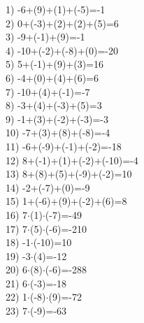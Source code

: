 \documentclass[a4paper,10pt]{article}
\begin{document}
1)   -6+(9)+(1)+(-5)=-1
\vspace{0.5cm}\\2)   0+(-3)+(2)+(2)+(5)=6
\vspace{0.5cm}\\3)   -9+(-1)+(9)=-1
\vspace{0.5cm}\\4)   -10+(-2)+(-8)+(0)=-20
\vspace{0.5cm}\\5)   5+(-1)+(9)+(3)=16
\vspace{0.5cm}\\6)   -4+(0)+(4)+(6)=6
\vspace{0.5cm}\\7)   -10+(4)+(-1)=-7
\vspace{0.5cm}\\8)   -3+(4)+(-3)+(5)=3
\vspace{0.5cm}\\9)   -1+(3)+(-2)+(-3)=-3
\vspace{0.5cm}\\10)   -7+(3)+(8)+(-8)=-4
\vspace{0.5cm}\\11)   -6+(-9)+(-1)+(-2)=-18
\vspace{0.5cm}\\12)   8+(-1)+(1)+(-2)+(-10)=-4
\vspace{0.5cm}\\13)   8+(8)+(5)+(-9)+(-2)=10
\vspace{0.5cm}\\14)   -2+(-7)+(0)=-9
\vspace{0.5cm}\\15)   1+(-6)+(9)+(-2)+(6)=8
\vspace{0.5cm}\\16)   7$\cdot$(1)$\cdot$(-7)=-49
\vspace{0.5cm}\\17)   7$\cdot$(5)$\cdot$(-6)=-210
\vspace{0.5cm}\\18)   -1$\cdot$(-10)=10
\vspace{0.5cm}\\19)   -3$\cdot$(4)=-12
\vspace{0.5cm}\\20)   6$\cdot$(8)$\cdot$(-6)=-288
\vspace{0.5cm}\\21)   6$\cdot$(-3)=-18
\vspace{0.5cm}\\22)   1$\cdot$(-8)$\cdot$(9)=-72
\vspace{0.5cm}\\23)   7$\cdot$(-9)=-63
\end{document}
